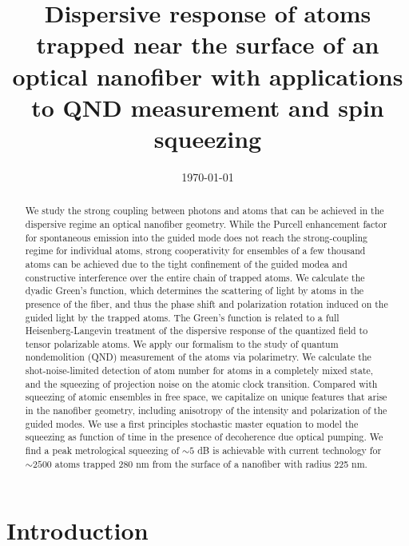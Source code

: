 \documentclass[preprint, aps,pra,onecolumn]{revtex4-1} %
\begin{document}
\title{Dispersive response of atoms trapped near the surface of an optical nanofiber with applications to QND measurement and spin squeezing}
\author{}
\date{\today}

\begin{abstract}
We study the strong coupling between photons and atoms that can be achieved in the dispersive regime an optical nanofiber geometry.  While the Purcell enhancement factor for spontaneous emission into the guided mode does not reach the strong-coupling regime for individual atoms, strong cooperativity for ensembles of a few thousand atoms can be achieved due to the tight confinement of the guided modea and constructive interference over the entire chain of trapped atoms. We calculate the dyadic Green's function, which determines the scattering of light by atoms in the presence of the fiber, and thus the phase shift and polarization rotation induced on the guided light by the trapped atoms.  The Green's function is related to a full Heisenberg-Langevin treatment of the dispersive response of the quantized field to tensor polarizable atoms.  We apply our formalism to the study of quantum nondemolition (QND) measurement of the atoms via polarimetry.  We calculate the shot-noise-limited detection of atom number for atoms in a completely mixed state, and the squeezing of projection noise on the atomic clock transition.  Compared with squeezing of atomic ensembles in free space, we capitalize on unique features that arise in the nanofiber geometry, including anisotropy of the intensity and polarization of the guided modes.  We use a first principles stochastic master equation to model the squeezing as function of time in the presence of decoherence due optical pumping.  We find a peak metrological squeezing of $\sim 5$ dB is achievable with current technology for $\sim 2500$ atoms trapped 280 nm from the surface of a nanofiber with radius 225 nm.  
\end{abstract}

\maketitle

\section{Introduction}
\end{document}
